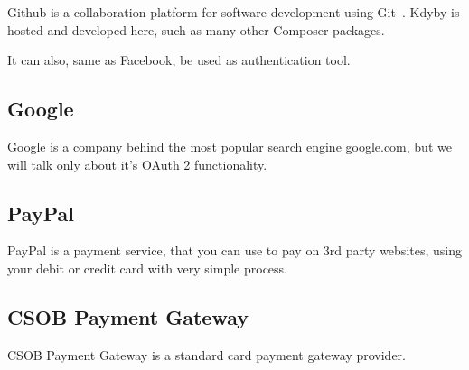 Github is a collaboration platform for software development using Git~\cite{wiki:git}. Kdyby is hosted and developed here, such as many other Composer packages.

It can also, same as Facebook, be used as authentication tool.

\subsection{Google} \label{sec:theory:google}

Google is a company behind the most popular search engine google.com, but we will talk only about it's OAuth 2 functionality.

\subsection{PayPal} \label{sec:theory:paypal}

PayPal is a payment service, that you can use to pay on 3rd party websites, using your debit or credit card with very simple process.

\subsection{CSOB Payment Gateway} \label{sec:theory:csob-payment}

CSOB Payment Gateway is a standard card payment gateway provider.
